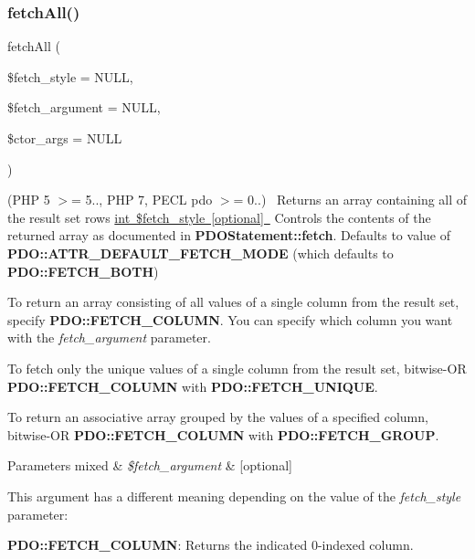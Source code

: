 \subsubsection{\texorpdfstring{fetch\+All()}{fetchAll()}}
{\footnotesize\ttfamily fetch\+All (\begin{DoxyParamCaption}\item[{}]{\$fetch\+\_\+style = {\ttfamily NULL},  }\item[{}]{\$fetch\+\_\+argument = {\ttfamily NULL},  }\item[{}]{\$ctor\+\_\+args = {\ttfamily NULL} }\end{DoxyParamCaption})}

(P\+HP 5 $>$= 5.., P\+HP 7, P\+E\+CL pdo $>$= 0..)~\newline
 Returns an array containing all of the result set rows \mbox{\hyperlink{}{int \$fetch\+\_\+style \mbox{[}optional\mbox{]} }} Controls the contents of the returned array as documented in {\bfseries P\+D\+O\+Statement\+::fetch}. Defaults to value of {\bfseries P\+D\+O\+::\+A\+T\+T\+R\+\_\+\+D\+E\+F\+A\+U\+L\+T\+\_\+\+F\+E\+T\+C\+H\+\_\+\+M\+O\+DE} (which defaults to {\bfseries P\+D\+O\+::\+F\+E\+T\+C\+H\+\_\+\+B\+O\+TH}) 

To return an array consisting of all values of a single column from the result set, specify {\bfseries P\+D\+O\+::\+F\+E\+T\+C\+H\+\_\+\+C\+O\+L\+U\+MN}. You can specify which column you want with the {\itshape fetch\+\_\+argument} parameter. 

To fetch only the unique values of a single column from the result set, bitwise-\/\+OR {\bfseries P\+D\+O\+::\+F\+E\+T\+C\+H\+\_\+\+C\+O\+L\+U\+MN} with {\bfseries P\+D\+O\+::\+F\+E\+T\+C\+H\+\_\+\+U\+N\+I\+Q\+UE}. 

To return an associative array grouped by the values of a specified column, bitwise-\/\+OR {\bfseries P\+D\+O\+::\+F\+E\+T\+C\+H\+\_\+\+C\+O\+L\+U\+MN} with {\bfseries P\+D\+O\+::\+F\+E\+T\+C\+H\+\_\+\+G\+R\+O\+UP}. 


\begin{DoxyParams}[1]{Parameters}
mixed & {\em \$fetch\+\_\+argument} & \mbox{[}optional\mbox{]} \\
\hline
\end{DoxyParams}
This argument has a different meaning depending on the value of the {\itshape fetch\+\_\+style} parameter\+: 

{\bfseries P\+D\+O\+::\+F\+E\+T\+C\+H\+\_\+\+C\+O\+L\+U\+MN}\+: Returns the indicated 0-\/indexed column. 


